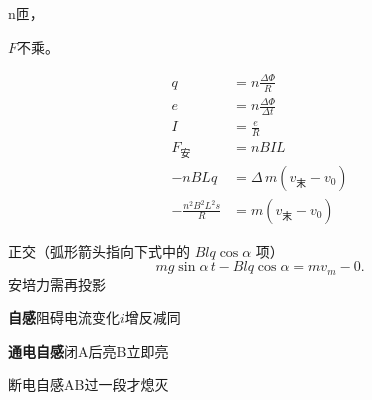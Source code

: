 n匝，%

$F$不乘\unclear{$\Phi$}。%


\begin{align*}
q&=n\frac{\Delta\Phi}{R}\\
e&=n\frac{\Delta\Phi}{\Delta t}\\
I&=\frac{e}{R}\\
F_{\text{安}}&=nBIL\\
-nBLq&=\Delta\, m(v_{\text{末}}-v_0)\\ %
-\frac{n^2B^2L^2s}{R}&=m(v_{\text{末}}-v_0)
\end{align*}
\begin{problem}[4]

\begin{solution}
正交（弧形箭头指向下式中的 $Blq\cos\alpha$ 项）
\[
mg\sin\alpha\, t-Blq\cos\alpha=mv_m-0.
\]
安培力需再投影
\end{solution}
\end{problem}
\textbf{自感}\quad {}阻碍电流变化\quad $i$增反减同



\textbf{通电自感}\quad 闭A后亮\quad B立即亮

断电自感\quad AB过一段才熄灭

